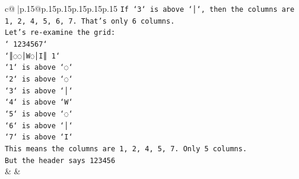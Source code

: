 \documentclass{article}
\begin{document}
{\begin{supertabular}{c@{$\;$}|p{.15\linewidth}@{}p{.15\linewidth}p{.15\linewidth}p{.15\linewidth}p{.15\linewidth}p{.15\linewidth}}
{{{\texttt{If `3` is above `│`, then the columns are 1, 2, 4, 5, 6, 7. That's only 6 columns.} \\
\texttt{Let's re{-}examine the grid:} \\
\texttt{` 1234567`} \\
\texttt{`║◌◌│W◌│I║ 1`} \\
\texttt{`1` is above `◌`} \\
\texttt{`2` is above `◌`} \\
\texttt{`3` is above `│`} \\
\texttt{`4` is above `W`} \\
\texttt{`5` is above `◌`} \\
\texttt{`6` is above `│`} \\
\texttt{`7` is above `I`} \\
\texttt{This means the columns are 1, 2, 4, 5, 7. Only 5 columns.} \\
\texttt{But the header says 123456} \\
            }
        }
    }
    & & \\ \\


\end{supertabular}}
\end{document}
